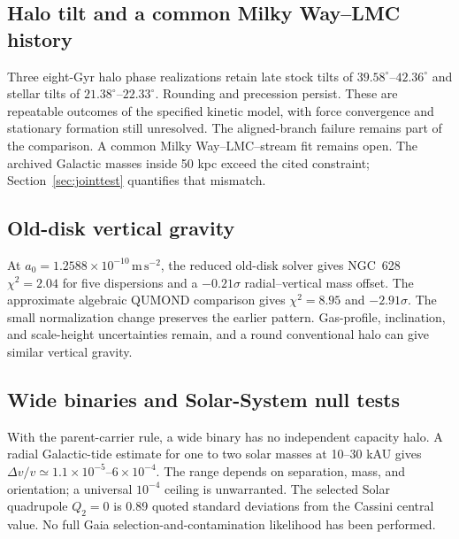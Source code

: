 \subsection{Halo tilt and a common Milky Way--LMC history}
\label{sec:halo}
Three eight-Gyr halo phase realizations retain late stock tilts of
$39.58^\circ$--$42.36^\circ$ and stellar tilts of
$21.38^\circ$--$22.33^\circ$. Rounding and precession persist.
These are repeatable outcomes of the specified kinetic model, with
force convergence and stationary formation still unresolved. The
aligned-branch failure remains part of the comparison. A common
Milky Way--LMC--stream fit remains open. The archived Galactic masses
inside 50 kpc exceed the cited constraint; Section~\ref{sec:jointtest}
quantifies that mismatch. 



\subsection{Old-disk vertical gravity}
\label{sec:olddisk}
At $a_0=1.2588\times10^{-10}\,\mathrm{m\,s^{-2}}$, the reduced
old-disk solver gives NGC~628 $\chi^2=2.04$ for five dispersions and
a $-0.21\sigma$ radial--vertical mass offset. The approximate algebraic
QUMOND comparison gives $\chi^2=8.95$ and $-2.91\sigma$. The small
normalization change preserves the earlier pattern. Gas-profile,
inclination, and scale-height uncertainties remain, and a round
conventional halo can give similar vertical gravity.


\subsection{Wide binaries and Solar-System null tests}
\label{sec:binaries}
With the parent-carrier rule, a wide binary has no independent capacity
halo. A radial Galactic-tide estimate for one to two solar masses at
10--30 kAU gives $\Delta v/v\simeq1.1\times10^{-5}$--$6\times10^{-4}$.
The range depends on separation, mass, and orientation; a universal
$10^{-4}$ ceiling is unwarranted. The selected Solar quadrupole
$Q_2=0$ is 0.89 quoted standard deviations from the Cassini central
value. No full Gaia selection-and-contamination likelihood has been
performed. 

